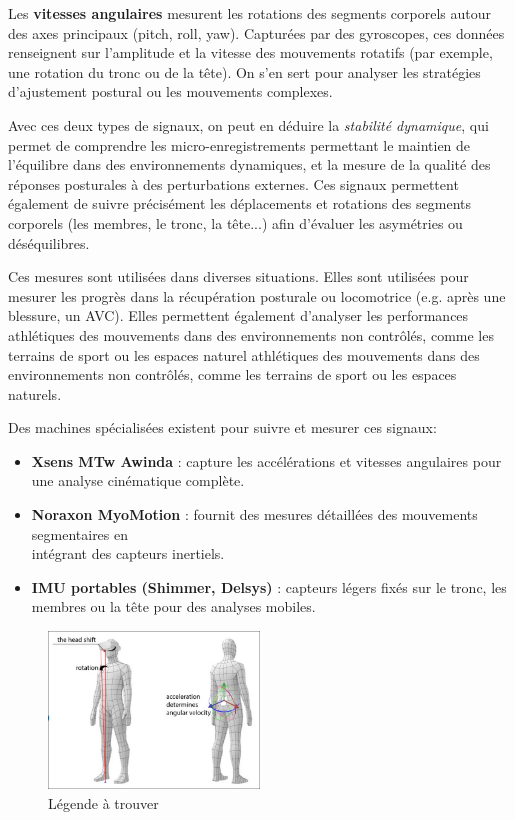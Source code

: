Les \textbf{vitesses angulaires} mesurent les rotations des segments corporels autour des axes principaux (pitch, roll, yaw). 
Capturées par des gyroscopes, ces données renseignent sur l’amplitude et la vitesse des mouvements rotatifs (par exemple, une rotation du tronc ou de la tête).
On s'en sert pour analyser les stratégies d'ajustement postural ou les mouvements complexes.

Avec ces deux types de signaux, on peut en déduire la \textit{stabilité dynamique}, qui permet de comprendre les micro-enregistrements permettant le maintien de l'équilibre dans des environnements dynamiques, et la mesure de la qualité des réponses posturales à des perturbations externes.
Ces signaux permettent également de suivre précisément les déplacements et rotations des segments corporels (les membres, le tronc, la tête...) afin d'évaluer les asymétries ou déséquilibres.

Ces mesures sont utilisées dans diverses situations.
Elles sont utilisées pour mesurer les progrès dans la récupération posturale ou locomotrice (e.g. après une blessure, un AVC).
Elles permettent également d'analyser les performances athlétiques des mouvements dans des environnements non contrôlés,
comme les terrains de sport ou les espaces naturel athlétiques des mouvements dans des environnements non contrôlés, comme les terrains de sport ou les espaces naturels.

Des machines spécialisées existent pour suivre et mesurer ces signaux:
\begin{itemize}
  \item \textbf{Xsens MTw Awinda} : capture les accélérations et vitesses angulaires pour \\ une analyse cinématique complète.
  \item \textbf{Noraxon MyoMotion} : fournit des mesures détaillées des mouvements segmentaires en \\ intégrant des capteurs inertiels.
  \item \textbf{IMU portables (Shimmer, Delsys)} : capteurs légers fixés sur le tronc, les membres ou la tête pour des analyses mobiles.
\end{itemize}

\begin{figure}[ht]
  \begin{center}
    \includegraphics[width=0.5\textwidth]{images/legende.png}
  \end{center}
  \caption{Légende à trouver}\label{fig:legende}
\end{figure}

